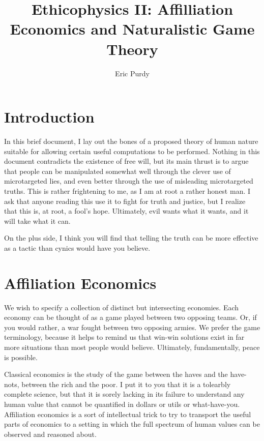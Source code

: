 \documentclass{article}
\title{Ethicophysics II: Affilliation Economics and Naturalistic Game
Theory}
\author{Eric Purdy}
\begin{document}
\maketitle

\begin{abstract}
\end{abstract}

\section{Introduction}

In this brief document, I lay out the bones of a proposed theory of
human nature suitable for allowing certain useful computations to be
performed. Nothing in this document contradicts the existence of free
will, but its main thrust is to argue that people can be manipulated
somewhat well through the clever use of microtargeted lies, and even
better through the use of misleading microtargeted truths. This is
rather frightening to me, as I am at root a rather honest man. I ask
that anyone reading this use it to fight for truth and justice, but I
realize that this is, at root, a fool's hope. Ultimately, evil wants
what it wants, and it will take what it can.

On the plus side, I think you will find that telling the truth can be
more effective as a tactic than cynics would have you believe.

\section{Affiliation Economics}

We wish to specify a collection of distinct but intersecting
economies. Each economy can be thought of as a game played between two
opposing teams. Or, if you would rather, a war fought between two
opposing armies. We prefer the game terminology, because it helps to
remind us that win-win solutions exist in far more situations than
most people would believe. Ultimately, fundamentally, peace is
possible.

Classical economics is the study of the game between the haves and the
have-nots, between the rich and the poor. I put it to you that it is a
tolearbly complete science, but that it is sorely lacking in its
failure to understand any human value that cannot be quantified in
dollars or utils or what-have-you. Affiliation economics is a sort of
intellectual trick to try to transport the useful parts of economics
to a setting in which the full spectrum of human values can be
observed and reasoned about.
\end{document}
